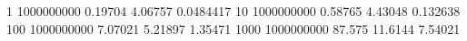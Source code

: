 1 1000000000 0.19704 4.06757 0.0484417
10 1000000000 0.58765 4.43048 0.132638
100 1000000000 7.07021 5.21897 1.35471
1000 1000000000 87.575 11.6144 7.54021
